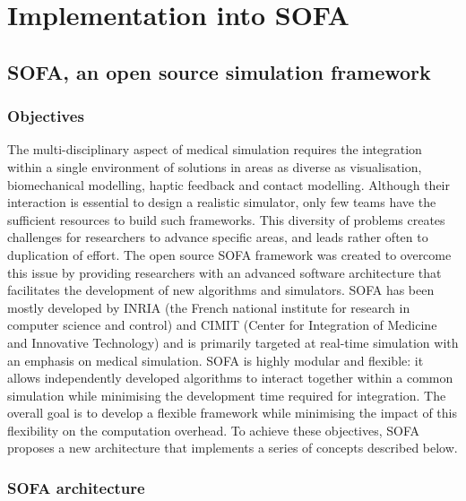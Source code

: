 	
\section{Implementation into SOFA}

	\subsection{SOFA, an open source simulation framework}

\subsubsection*{Objectives}
The multi-disciplinary aspect of medical simulation requires the integration within a single environment of solutions in areas as diverse as visualisation, biomechanical modelling, haptic feedback and contact modelling. Although their interaction is essential to design a realistic simulator, only few teams have the sufficient resources to build such frameworks. This diversity of problems creates challenges for researchers to advance specific areas, and leads rather often to duplication of effort. The open source SOFA framework \citep{Allard07} was created to overcome this issue by providing researchers with an advanced software architecture that facilitates the development of new algorithms and simulators. SOFA has been mostly developed by INRIA (the French national institute for research in computer science and control) and CIMIT (Center for Integration of Medicine and Innovative Technology) and is primarily targeted at real-time simulation with an emphasis on medical simulation. SOFA is highly modular and flexible: it allows independently developed algorithms to interact together within a common simulation while minimising the development time required for integration. The overall goal is to develop a flexible framework while minimising the impact of this flexibility on the computation overhead. To achieve these objectives, SOFA proposes a new architecture that implements a series of concepts described below. 

\subsubsection*{SOFA architecture}

